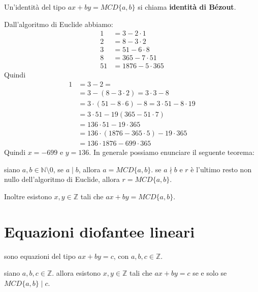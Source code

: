 \documentclass[../main.tex]{subfiles}
\begin{document}
\begin{definition}
    Un'identità del tipo $ax + by = MCD \{a,b\}$ si chiama \textbf{identità di Bézout}.
\end{definition}
Dall'algoritmo di Euclide abbiamo:
\begin{align*}
    1  & = 3 - 2 \cdot 1      \\
    2  & = 8 - 3 \cdot 2      \\
    3  & = 51 - 6 \cdot 8     \\
    8  & = 365 - 7 \cdot 51   \\
    51 & = 1876 - 5 \cdot 365
\end{align*}
Quindi
\begin{align*}
    1 & = 3 - 2 =                                                \\
      & = 3 - (8 - 3 \cdot 2) = 3 \cdot 3 - 8                    \\
      & = 3 \cdot (51 - 8 \cdot 6) - 8 = 3 \cdot 51 - 8 \cdot 19 \\
      & = 3 \cdot 51 - 19(365 - 51 \cdot 7)                      \\
      & = 136 \cdot 51 - 19 \cdot 365                            \\
      & = 136 \cdot (1876 - 365 \cdot 5) - 19 \cdot 365          \\
      & = 136 \cdot 1876 - 699 \cdot 365
\end{align*}
Quindi $x = -699$ e $y = 136$. In generale possiamo enunciare il seguente teorema:

\begin{theorem}
    siano $a,b \in \mathbb{N} \setminus {0}$, se $a \mid b$, allora $a = MCD\{a,b\}$. se $a \nmid b$ e $r$ è l'ultimo resto non nullo dell'algoritmo di Euclide, allora $r = MCD \{a,b\}$.

    Inoltre esistono $x,y \in \mathbb{Z} $ tali che $ax + by = MCD \{a,b\}$.
\end{theorem}

\section{Equazioni diofantee lineari}
sono equazioni del tipo $ax + by = c$, con $a,b,c \in \mathbb{Z} $.

\begin{proposition}
    siano $a,b,c \in \mathbb{Z} $. allora esistono $x,y \in \mathbb{Z} $ tali che $ax + by = c$ se e solo se $MCD \{a,b\} \mid c$.
\end{proposition}
\end{document}
